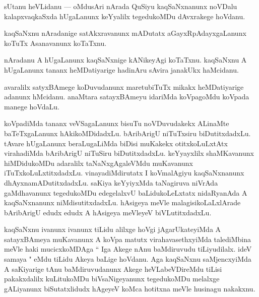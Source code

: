 \documentclass{article}
\begin{document}

\begin{mn}%
sUtanu heVLidanu --- oMdusAri nArada QuSiyu kaqSaNxnanunx noVDalu kalapxvaqkaSxda hUgaLanunx 
keYyalilx tegedukoMDu dAvxrakege hoVdanu.
\end{mn}

\begin{mn}%
kaqSaNxnu nAradanige satAkxravanunx mADutatx aGayxRpAdayxgaLanunx koTuTx Asanavanunx koTaTxnu.
\end{mn}

\begin{mn}%
nAradanu A hUgaLanunx kaqSaNxnige kANikeyAgi koTaTxnu. kaqSaNxnu A hUgaLanunx tananx heMDatiyarige 
hadinAru sAvira janakUkx haMcidanu.
\end{mn}

\begin{mn}%
avaralilx satyxBAmege koDuvudanunx maretubiTuTx mikakx heMDatiyarige adanunx hMcidanu. anaMtara 
satayxBAmeyu idariMda koVpagoMdu koVpada manege hoVdaLu.
\end{mn}

\begin{mn}%
koVpadiMda tananx veVSagaLanunx bisuTu noVDuvudakekx ALinaMte baTeTxgaLanunx hAkikoMDidadxLu. 
bAribArigU niTuTxsiru biDutitxdadxLu. tAvare hUgaLanunx beraLugaLiMda biDisi muKakekx 
otitxkoLuLxtAtx virahadiMda bAribArigU niTuSiru biDutitxdadxLu. keYyayxlilx shaMKavanunx 
hiMDidukoMDu adaralilx taNaNxgAgaleVMdu muKavanunx iTuTxkoLuLxtitxdadxLu. vinayadiMdirutatx I 
koVmalAgiyu kaqSaNxnanunx dhAyxnamADutitxdadxLu. saKiya keYyiyxMda taNagiruva niVrAda gaMdhavanunx 
tegedukoMDu edegelalxvU baLidukoLeLxtatx nidaRyanAda A kaqSaNxnanunx niMdisutitxdadxLu. hAsigeya 
meVle malagisikoLaLxlArade bAribArigU edudx edudx A hAsigeya meVleyeV biVLutitxdadxLu.
\end{mn}

\begin{mn}%
kaqSaNxnu ivanunx ivanunx tiLidu alilxge hoVgi jAgarUkateyiMda A satayxBAmeya muKavanunx A koVpa 
matutx virahavasethxyiMda talediMbina meVle haki mucicxkoMDAga `` Iga Akege nAnu baMdiruvudu 
tiLiyudilalx. ideV samaya " eMdu tiLidu Akeya baLige hoVdanu. Aga kaqSaNxnu saMjencxyiMda A 
saKiyarige tAnu baMdiruvudanunx Akege heVLabeVDireMdu tiLisi pakakxdalilx kuLitukoMDu 
biVsaNigeyanunx tegedukoMDu melalxge gALiyanunx biSutatxlidudx hAgeyeV koMca hotitxna meVle 
husinagu nakakxnu.
\end{mn}
\end{document}
